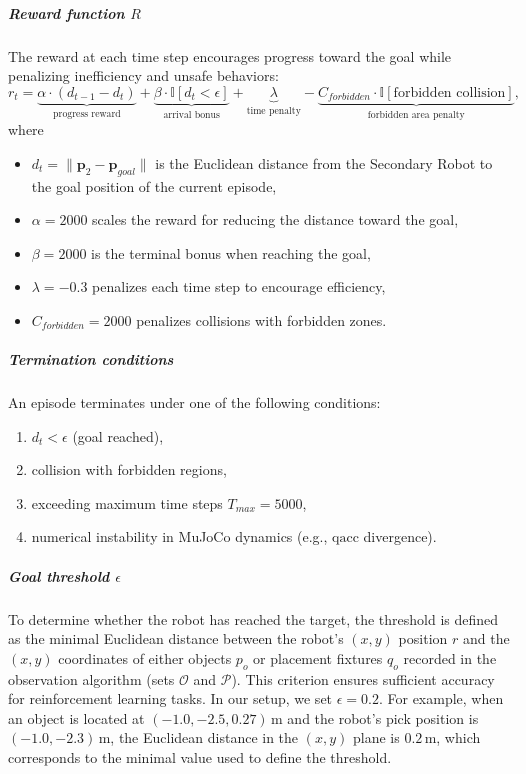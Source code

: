 \documentclass[english, 12pt, a4paper, elec, utf8, a-2b, online]{aaltothesis}
\begin{document}
\subparagraph{Reward function $R$}
The reward at each time step encourages progress toward the goal while penalizing inefficiency and unsafe behaviors:
\begin{equation}
r_t = \underbrace{\alpha \cdot (d_{t-1} - d_t)}_{\text{progress reward}} + 
      \underbrace{\beta \cdot \mathbb{I}[d_t < \epsilon]}_{\text{arrival bonus}} +
      \underbrace{\lambda}_{\text{time penalty}} - 
      \underbrace{C_{forbidden} \cdot \mathbb{I}[\text{forbidden collision}]}_{\text{forbidden area penalty}},
\end{equation}
where
\begin{itemize}
    \item $d_t = \|\mathbf{p}_2 - \mathbf{p}_{goal}\|$ is the Euclidean distance from the Secondary Robot to the goal position of the current episode,
    \item $\alpha = 2000$ scales the reward for reducing the distance toward the goal,
    \item $\beta = 2000$ is the terminal bonus when reaching the goal,
    \item $\lambda = -0.3$ penalizes each time step to encourage efficiency,
    \item $C_{forbidden} = 2000$ penalizes collisions with forbidden zones.
\end{itemize}

\subparagraph{Termination conditions}
An episode terminates under one of the following conditions:
\begin{enumerate}
    \item $d_t < \epsilon$ (goal reached),
    \item collision with forbidden regions,
    \item exceeding maximum time steps $T_{max} = 5000$,
    \item numerical instability in MuJoCo dynamics (e.g., $\text{qacc}$ divergence).
\end{enumerate}

\subparagraph{Goal threshold $\epsilon$}
To determine whether the robot has reached the target, the threshold is defined as the minimal Euclidean distance between the robot's $(x, y)$ position $r$ and the $(x, y)$ coordinates of either objects $p_o$ or placement fixtures $q_o$ recorded in the observation algorithm (sets $\mathcal{O}$ and $\mathcal{P}$). This criterion ensures sufficient accuracy for reinforcement learning tasks. In our setup, we set $\epsilon = 0.2$. For example, when an object is located at $(-1.0, -2.5, 0.27)$\,m and the robot's pick position is $(-1.0, -2.3)$\,m, the Euclidean distance in the $(x, y)$ plane is $0.2$\,m, which corresponds to the minimal value used to define the threshold.
\end{document}
